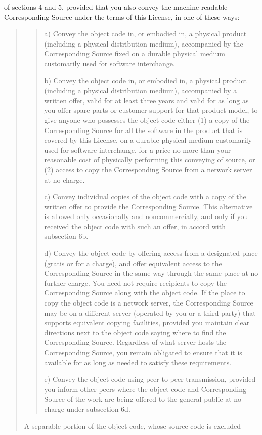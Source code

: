 \documentclass[letterpaper,10pt,english]{sphinxmanual}
\begin{document}
of sections 4 and 5, provided that you also convey the
machine-readable Corresponding Source under the terms of this License,
in one of these ways:
\begin{quote}
\begin{quote}

a) Convey the object code in, or embodied in, a physical product
(including a physical distribution medium), accompanied by the
Corresponding Source fixed on a durable physical medium
customarily used for software interchange.

b) Convey the object code in, or embodied in, a physical product
(including a physical distribution medium), accompanied by a
written offer, valid for at least three years and valid for as
long as you offer spare parts or customer support for that product
model, to give anyone who possesses the object code either (1) a
copy of the Corresponding Source for all the software in the
product that is covered by this License, on a durable physical
medium customarily used for software interchange, for a price no
more than your reasonable cost of physically performing this
conveying of source, or (2) access to copy the
Corresponding Source from a network server at no charge.

c) Convey individual copies of the object code with a copy of the
written offer to provide the Corresponding Source.  This
alternative is allowed only occasionally and noncommercially, and
only if you received the object code with such an offer, in accord
with subsection 6b.

d) Convey the object code by offering access from a designated
place (gratis or for a charge), and offer equivalent access to the
Corresponding Source in the same way through the same place at no
further charge.  You need not require recipients to copy the
Corresponding Source along with the object code.  If the place to
copy the object code is a network server, the Corresponding Source
may be on a different server (operated by you or a third party)
that supports equivalent copying facilities, provided you maintain
clear directions next to the object code saying where to find the
Corresponding Source.  Regardless of what server hosts the
Corresponding Source, you remain obligated to ensure that it is
available for as long as needed to satisfy these requirements.

e) Convey the object code using peer-to-peer transmission, provided
you inform other peers where the object code and Corresponding
Source of the work are being offered to the general public at no
charge under subsection 6d.
\end{quote}

A separable portion of the object code, whose source code is excluded
\end{quote}
\end{document}
